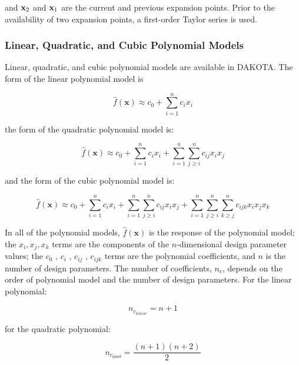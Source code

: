 and ${\bf x}_2$ and ${\bf x}_1$ are the current and previous expansion
points.  Prior to the availability of two expansion points, a
first-order Taylor series is used.

\subsubsection{Linear, Quadratic, and Cubic Polynomial Models}\label{models:surf:polynomial}

Linear, quadratic, and cubic polynomial models are available in
DAKOTA. The form of the linear polynomial model is

\begin{equation}
  \hat{f}(\mathbf{x}) \approx c_{0}+\sum_{i=1}^{n}c_{i}x_{i}
  \label{models:surf:equation01}
\end{equation}

the form of the quadratic polynomial model is:

\begin{equation}
  \hat{f}(\mathbf{x}) \approx c_{0}+\sum_{i=1}^{n}c_{i}x_{i}
  +\sum_{i=1}^{n}\sum_{j \ge i}^{n}c_{ij}x_{i}x_{j}
  \label{models:surf:equation02}
\end{equation}

and the form of the cubic polynomial model is:

\begin{equation}
  \hat{f}(\mathbf{x}) \approx c_{0}+\sum_{i=1}^{n}c_{i}x_{i}
  +\sum_{i=1}^{n}\sum_{j \ge i}^{n}c_{ij}x_{i}x_{j}
  +\sum_{i=1}^{n}\sum_{j \ge i}^{n}\sum_{k \ge j}^{n}
  c_{ijk}x_{i}x_{j}x_{k}
  \label{models:surf:equation03}
\end{equation}

In all of the polynomial models, $\hat{f}(\mathbf{x})$ is the response
of the polynomial model; the $x_{i},x_{j},x_{k}$ terms are the
components of the $n$-dimensional design parameter values; the $c_{0}$
, $c_{i}$ , $c_{ij}$ , $c_{ijk} $ terms are the polynomial
coefficients, and $n$ is the number of design parameters.  The number
of coefficients, $n_{c}$, depends on the order of polynomial model and
the number of design parameters. For the linear polynomial:

\begin{equation}
  n_{c_{linear}}=n+1
  \label{models:surf:equation04}
\end{equation}

for the quadratic polynomial:

\begin{equation}
  n_{c_{quad}}=\frac{(n+1)(n+2)}{2}
  \label{models:surf:equation05}
\end{equation}

